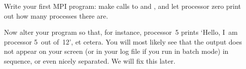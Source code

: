   \label{ex:hello-world-zero}
  Write your first MPI program: make calls to  and
  , and let processor zero print out how many
  processes there are.

  Now alter your program so that, for instance, processor~5 prints
  `Hello, I~am processor 5~out of~12', et cetera. You will most likely
  see that the output does not appear on your screen (or in your log
  file if you run in batch mode) in sequence, or even nicely
  separated. We will fix this later.
